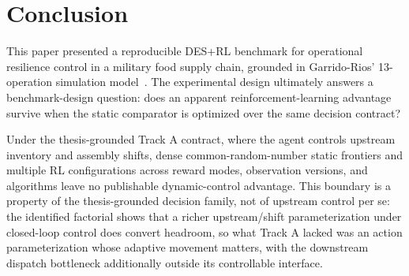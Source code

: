\hypertarget{6-conclusion}{%
\section{Conclusion}\label{6-conclusion}}

This paper presented a reproducible DES+RL benchmark for operational
resilience control in a military food supply chain, grounded in
Garrido-Rios' 13-operation simulation model~\cite{garrido2017}. The
experimental design ultimately answers a benchmark-design question: does an
apparent reinforcement-learning advantage survive when the static comparator
is optimized over the same decision contract?

Under the thesis-grounded Track A contract, where the agent controls
upstream inventory and assembly shifts, dense common-random-number
static frontiers and multiple RL configurations across reward modes,
observation versions, and algorithms leave no publishable dynamic-control
advantage. This boundary is a property of the thesis-grounded decision
family, not of upstream control per se: the identified factorial shows
that a richer upstream/shift parameterization under closed-loop control
does convert headroom, so what Track A lacked was an action
parameterization whose adaptive movement matters, with the downstream
dispatch bottleneck additionally outside its controllable interface.

